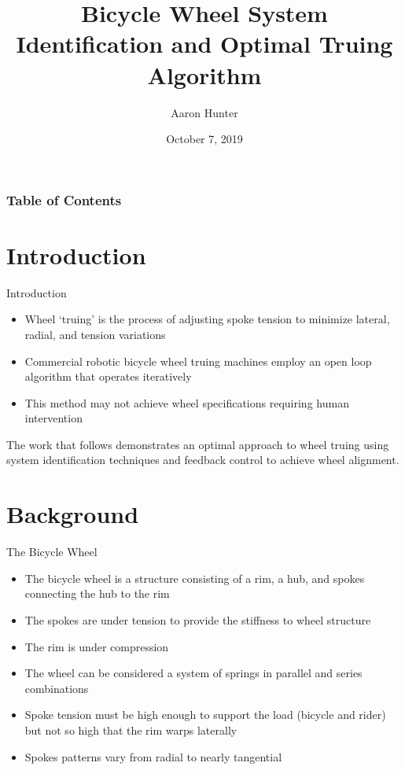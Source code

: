 \documentclass[mathserif]{beamer}
\title{Bicycle Wheel System Identification and Optimal Truing Algorithm}
\author{Aaron Hunter}
\date{October 7, 2019}
\begin{document}
\maketitle

\begin{frame}
    \frametitle{Table of Contents}
    \tableofcontents
\end{frame}

\section{Introduction}
  \begin{frame}{Introduction}
    \begin{itemize}
        \item Wheel `truing' is the process of adjusting spoke tension to minimize lateral, radial, and tension variations
        \item Commercial robotic bicycle wheel truing machines employ an open loop algorithm that operates iteratively
        \item This method may not achieve wheel specifications requiring human intervention
    \end{itemize}
     The work that follows demonstrates an optimal approach to wheel truing using system identification techniques and feedback control to achieve wheel alignment. 
  \end{frame}
    
\section{Background}

\begin{frame}{The Bicycle Wheel}
    \begin{itemize}
    \item The bicycle wheel is a structure consisting of a rim, a hub, and spokes connecting the hub to the rim
    \item The spokes are under tension to provide the stiffness to wheel structure
    \item The rim is under compression
    \item The wheel can be considered a system of springs in parallel and series combinations
    \item Spoke tension must be high enough to support the load (bicycle and rider) but not so high that the rim warps laterally
    \item Spokes patterns vary from radial to nearly tangential
    \end{itemize}
\end{frame}
\end{document}
